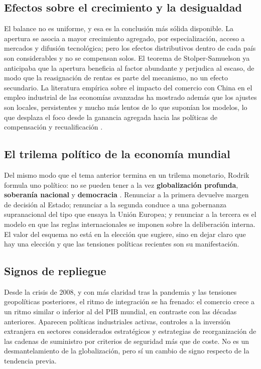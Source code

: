 \subsection{Efectos sobre el crecimiento y la desigualdad}

El balance no es uniforme, y esa es la conclusión más sólida disponible. La
apertura se asocia a mayor crecimiento agregado, por especialización, acceso a
mercados y difusión tecnológica; pero los efectos distributivos dentro de cada
país son considerables y no se compensan solos. El teorema de Stolper-Samuelson
ya anticipaba que la apertura beneficia al factor abundante y perjudica al
escaso, de modo que la reasignación de rentas es parte del mecanismo, no un
efecto secundario. La literatura empírica sobre el impacto del comercio con
China en el empleo industrial de las economías avanzadas ha mostrado además que
los ajustes son locales, persistentes y mucho más lentos de lo que suponían los
modelos, lo que desplaza el foco desde la ganancia agregada hacia las políticas
de compensación y recualificación \parencite{banerjee2020}.

\subsection{El trilema político de la economía mundial}

Del mismo modo que el tema anterior termina en un trilema monetario, Rodrik
formula uno político: no se pueden tener a la vez \textbf{globalización
profunda}, \textbf{soberanía nacional} y \textbf{democracia}
\parencite{rodrik2012}. Renunciar a la primera devuelve margen de decisión al
Estado; renunciar a la segunda conduce a una gobernanza supranacional del tipo
que ensaya la Unión Europea; y renunciar a la tercera es el modelo en que las
reglas internacionales se imponen sobre la deliberación interna. El valor del
esquema no está en la elección que sugiere, sino en dejar claro que hay una
elección y que las tensiones políticas recientes son su manifestación.

\subsection{Signos de repliegue}

Desde la crisis de 2008, y con más claridad tras la pandemia y las tensiones
geopolíticas posteriores, el ritmo de integración se ha frenado: el comercio
crece a un ritmo similar o inferior al del PIB mundial, en contraste con las
décadas anteriores. Aparecen políticas industriales activas, controles a la
inversión extranjera en sectores considerados estratégicos y estrategias de
reorganización de las cadenas de suministro por criterios de seguridad más que
de coste. No es un desmantelamiento de la globalización, pero sí un cambio de
signo respecto de la tendencia previa.

